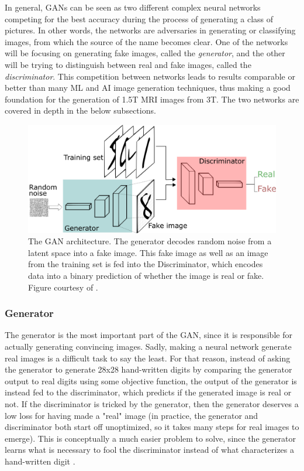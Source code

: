 \documentclass[11pt, fleqn, titlepage]{article}
\newcommand{\1}[1]{\mathds{1}\left[#1\right]}
\begin{document}
In general, GANs can be seen as two different complex neural networks competing for the best accuracy during  the process of generating a class of pictures. In other words, the networks are adversaries in generating or classifying images, from which the source of the name becomes clear. One of the networks will be focusing on generating fake images, called the \textit{generator}, and the other will be trying to distinguish between real and fake images, called the \textit{discriminator}. This competition between networks leads to results comparable or better than many ML and AI image generation techniques, thus making a good foundation for the generation of 1.5T MRI images from 3T. The two networks are covered in depth in the below subsections.
\begin{figure}[H]
	\centering
	\includegraphics[width=0.7\linewidth]{"imgs/GAN architecture"}
	\caption{The GAN architecture. The generator decodes random noise from a latent space into a fake image. This fake image as well as an image from the training set is fed into the Discriminator, which encodes data into a binary prediction of whether the image is real or fake. Figure courtesy of \cite{gan_introduction_towards_datascience}.}
	\label{fig:gan-architecture}
\end{figure}


\subsubsection{Generator}
The generator is the most important part of the GAN, since it is responsible for actually generating convincing images. Sadly, making a neural network generate real images is a difficult task to say the least. For that reason, instead of asking the generator to generate 28x28 hand-written digits by comparing the generator output to real digits using some objective function, the output of the generator is instead fed to the discriminator, which predicts if the generated image is real or not. If the discriminator is tricked by the generator, then the generator deserves a low loss for having made a "real" image (in practice, the generator and discriminator both start off unoptimized, so it takes many steps for real images to emerge). This is conceptually a much easier problem to solve, since the generator learns what is necessary to fool the discriminator instead of what characterizes a hand-written digit \cite{developers.google_generator}.
\end{document}
